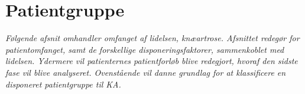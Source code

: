 \section{Patientgruppe}
\textit{Følgende afsnit omhandler omfanget af lidelsen, knæartrose. Afsnittet redegør for patientomfanget, samt de forskellige disponeringsfaktorer, sammenkoblet med lidelsen. Ydermere vil patienternes patientforløb blive redegjort, hvoraf den sidste fase vil blive analyseret. Ovenstående vil danne grundlag for at klassificere en disponeret patientgruppe til KA.}



